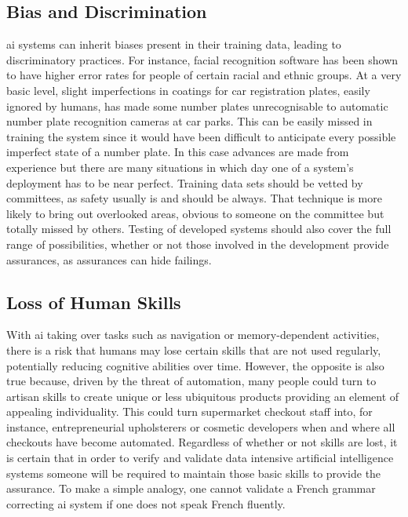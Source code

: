 \subsection{Bias and Discrimination}
\gls{ai} systems can inherit biases present in their training data, leading to discriminatory practices. For instance, facial recognition software has been shown to have higher error rates for people of certain racial and ethnic groups. At a very basic level, slight imperfections in coatings for car registration plates, easily ignored by humans, has made some number plates unrecognisable to automatic number plate recognition cameras at car parks. This can be easily missed in training the system since it would have been difficult to anticipate every possible imperfect state of a number plate. In this case advances are made from experience but there are many situations in which day one of a system’s deployment has to be near perfect. Training data sets should be vetted by committees, as safety usually is and should be always. That technique is more likely to bring out overlooked areas, obvious to someone on the committee but totally missed by others. Testing of developed systems should also cover the full range of possibilities, whether or not those involved in the development provide assurances, as assurances can hide failings.

\subsection{Loss of Human Skills}
With \gls{ai} taking over tasks such as navigation or memory-dependent activities, there is a risk that humans may lose certain skills that are not used regularly, potentially reducing cognitive abilities over time.  However, the opposite is also true because, driven by the threat of automation, many people could turn to artisan skills to create unique or less ubiquitous products providing an element of appealing individuality. This could turn supermarket checkout staff into, for instance, entrepreneurial upholsterers or cosmetic developers when and where all checkouts have become automated. Regardless of whether or not skills are lost, it is certain that in order to verify and validate data intensive artificial intelligence systems someone will be required to maintain those basic skills to provide the assurance. To make a simple analogy, one cannot validate a French grammar correcting \gls{ai} system if one does not speak French fluently.

